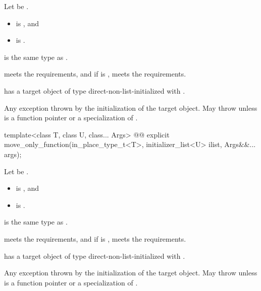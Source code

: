 \begin{itemdescr}
\pnum
Let  be .

\pnum
\constraints
\begin{itemize}
\item
{} is , and
\item
{} is .
\end{itemize}

\pnum
\mandates
{} is the same type as .

\pnum
\expects
{} meets the  requirements, and
if  is ,
 meets the  requirements.

\pnum
\ensures
{} has a target object of type 
direct-non-list-initialized with .

\pnum
\throws
Any exception thrown by the initialization of the target object.
May throw  unless  is
a function pointer or a specialization of .
\end{itemdescr}

%
\begin{itemdecl}
template<class T, class U, class... Args>
  @@ explicit move_only_function(in_place_type_t<T>, initializer_list<U> ilist, Args&&... args);
\end{itemdecl}

\begin{itemdescr}
\pnum
Let  be .

\pnum
\constraints
\begin{itemize}
\item
{} is
, and
\item
{} is .
\end{itemize}

\pnum
\mandates
{} is the same type as .

\pnum
\expects
{} meets the  requirements, and
if  is ,
 meets the  requirements.

\pnum
\ensures
{} has a target object of type 
direct-non-list-initialized with
.

\pnum
\throws
Any exception thrown by the initialization of the target object.
May throw  unless  is
a function pointer or a specialization of .
\end{itemdescr}

